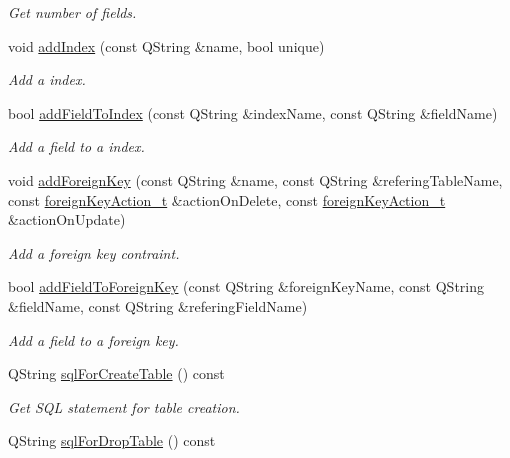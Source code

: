 \begin{DoxyCompactItemize}
\begin{DoxyCompactList}\small\item\em Get number of fields. \end{DoxyCompactList}\item 
void \hyperlink{classmdt_sql_schema_table_a55c4ff0c8d01bf794e84cf4828d2cb56}{addIndex} (const QString \&name, bool unique)
\begin{DoxyCompactList}\small\item\em Add a index. \end{DoxyCompactList}\item 
bool \hyperlink{classmdt_sql_schema_table_a3deb6f2b10178c252afbaabefb687722}{addFieldToIndex} (const QString \&indexName, const QString \&fieldName)
\begin{DoxyCompactList}\small\item\em Add a field to a index. \end{DoxyCompactList}\item 
\hypertarget{classmdt_sql_schema_table_a48ab41fda7864ec8cd59468de2475ff2}{
void \hyperlink{classmdt_sql_schema_table_a48ab41fda7864ec8cd59468de2475ff2}{addForeignKey} (const QString \&name, const QString \&referingTableName, const \hyperlink{classmdt_sql_schema_table_a1738e443f03dc69b914edb967cb911be}{foreignKeyAction\_\-t} \&actionOnDelete, const \hyperlink{classmdt_sql_schema_table_a1738e443f03dc69b914edb967cb911be}{foreignKeyAction\_\-t} \&actionOnUpdate)}
\label{classmdt_sql_schema_table_a48ab41fda7864ec8cd59468de2475ff2}

\begin{DoxyCompactList}\small\item\em Add a foreign key contraint. \end{DoxyCompactList}\item 
bool \hyperlink{classmdt_sql_schema_table_a0909cc0e3ad602312ddf44de397d9fe4}{addFieldToForeignKey} (const QString \&foreignKeyName, const QString \&fieldName, const QString \&referingFieldName)
\begin{DoxyCompactList}\small\item\em Add a field to a foreign key. \end{DoxyCompactList}\item 
\hypertarget{classmdt_sql_schema_table_a8a072145d85a6a2c183e01aaa6d91a5d}{
QString \hyperlink{classmdt_sql_schema_table_a8a072145d85a6a2c183e01aaa6d91a5d}{sqlForCreateTable} () const }
\label{classmdt_sql_schema_table_a8a072145d85a6a2c183e01aaa6d91a5d}

\begin{DoxyCompactList}\small\item\em Get SQL statement for table creation. \end{DoxyCompactList}\item 
\hypertarget{classmdt_sql_schema_table_a35fd4ed657f48013747973fef78be345}{
QString \hyperlink{classmdt_sql_schema_table_a35fd4ed657f48013747973fef78be345}{sqlForDropTable} () const }
\label{classmdt_sql_schema_table_a35fd4ed657f48013747973fef78be345}


\end{DoxyCompactItemize}
